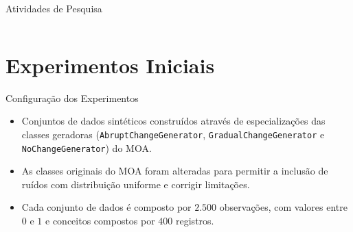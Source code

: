 \documentclass[10pt]{beamer}
\begin{document}
\begin{frame}{Atividades de Pesquisa}
\begin{table}[ht]
\begin{center}
{\begin{tabular}{|c|l|l|l|l|l|l|l|l|l|l|l|l|l|l|l|l|l|l|l|l|l|l|l|l|}
        \hline
        \end{tabular}
        } %
        \end{center}
    \end{table}
\end{frame}

\section{Experimentos Iniciais}

\begin{frame}{Configuração dos Experimentos}
    \begin{itemize}
        \item<1 -> Conjuntos de dados sintéticos construídos através de especializações das classes geradoras (\texttt{AbruptChangeGenerator}, \texttt{GradualChangeGenerator} e \texttt{NoChangeGenerator}) do MOA.
        \item<2 -> As classes originais do MOA foram alteradas para permitir a inclusão de ruídos com distribuição uniforme e corrigir limitações.
        \item<3 -> Cada conjunto de dados é composto por $2.500$ observações, com valores entre $0$ e $1$ e conceitos compostos por $400$ registros.
      \end{itemize}
\end{frame}
\end{document}
